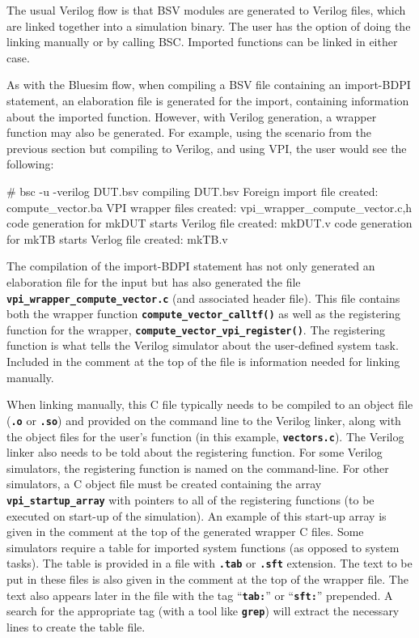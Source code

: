 \documentclass{article}
\newenvironment{centerboxverbatim}
  {\center
   \boxedverbatim}
  {\endboxedverbatim
  {\endcenter }}
\begin{document}
The usual Verilog flow is that BSV modules are generated to Verilog
files, which are linked together into a simulation binary.  The user
has the option of doing the linking manually or by calling BSC.
Imported functions can be linked in either case.

As with the Bluesim flow, when compiling a BSV file containing an
import-BDPI statement, an elaboration file is generated for the import,
containing information about the imported function.  However, with Verilog
generation, a wrapper function may also be generated.  For example,
using the scenario from the previous section but compiling to Verilog,
and using VPI, the user would see the following:

\begin{centerboxverbatim}
# bsc -u -verilog DUT.bsv
compiling DUT.bsv
Foreign import file created: compute_vector.ba
VPI wrapper files created: vpi_wrapper_compute_vector.{c,h}
code generation for mkDUT starts
Verilog file created: mkDUT.v
code generation for mkTB starts
Verlog file created: mkTB.v
\end{centerboxverbatim}

The compilation of the import-BDPI statement has not only generated
an elaboration file for the input but has also generated the file
{\bf\tt vpi\_wrapper\_compute\_vector.c} (and associated header file).
This file contains
both the wrapper function {\bf\tt compute\_vector\_calltf()} as
well as the registering function for the wrapper,
{\bf\tt compute\_vector\_vpi\_register()}.
The registering function is what tells the Verilog simulator about the
user-defined system task.  Included in the comment at the top of the
file is information needed for linking manually.

When linking manually, this C file typically needs to be compiled to
an object file ({\bf\tt .o} or {\bf\tt .so}) and provided on the
command line to the Verilog linker, along with the object files for
the user's function (in this example, {\bf\tt vectors.c}).  The
Verilog linker also needs to be told about the registering function.
For some Verilog simulators, the registering function is named on the
command-line.  For other simulators, a C object file must be created
containing the array {\bf\tt vpi\_startup\_array} with pointers to all
of the registering functions (to be executed on start-up of the
simulation).  An example of this start-up array is given in the comment
at the top of the generated wrapper C files.  Some simulators require
a table for imported system functions (as opposed to system tasks).
The table is provided in a file with {\bf\tt .tab} or {\bf\tt .sft}
extension.  The text to be put in these files is also given in the
comment at the top of the wrapper file.  The text also appears later
in the file with the tag ``{\bf\tt tab:}'' or ``{\bf\tt sft:}''
prepended.  A search for the appropriate tag (with a tool like {\bf\tt grep})
will extract the necessary lines to create the table file.
\end{document}
